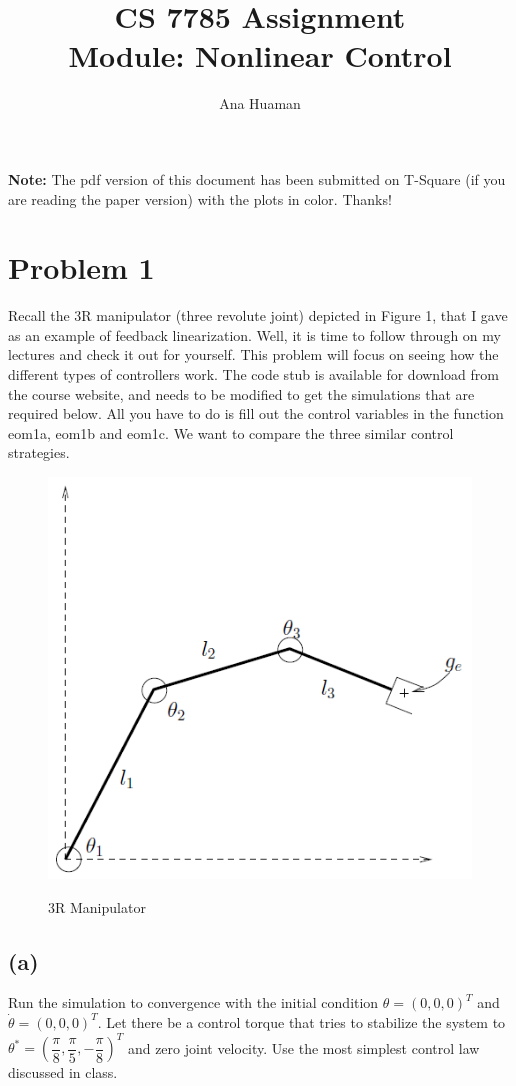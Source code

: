 \documentclass[10pt,a4paper]{article}
\author{Ana Huaman}
\title{\textbf{CS 7785 Assignment} \\ Module: Nonlinear Control}
\begin{document}
\maketitle

\textbf{Note:} The pdf version of this document has been submitted on T-Square (if you are reading the paper version) with the plots in color. Thanks!

\section*{Problem 1}
Recall the 3R manipulator (three revolute joint) depicted in Figure 1, that I gave as an example of feedback linearization. Well, it is time to follow through on my lectures and check it out for yourself. This problem will focus on seeing how the different types of controllers work. The code stub is available for download from the course website, and needs to be modified to get the simulations that are required below. All you have to do is fill out the control variables in the function eom1a, eom1b and eom1c. We want to compare the three similar control strategies.

\begin{figure}[hb]
  \centering
  \includegraphics[angle = 0, scale = 0.3]{figures/manipulator3R.png} 
  \label{fig:manipulator3R}
  \caption{3R Manipulator}
\end{figure}

\subsection*{(a)}
Run the simulation to convergence with the initial condition $\theta = (0,0,0)^{T}$ and $\dot{\theta} = (0,0,0)^{T}$. Let there be a control torque that tries to stabilize the system to $\theta^{*} = ( \dfrac{\pi}{8}, \dfrac{\pi}{5}, -\dfrac{\pi}{8})^{T}$ and zero joint velocity. Use the most simplest control law discussed in class.
\end{document}
